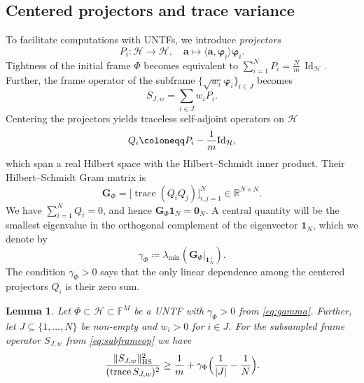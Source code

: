 \documentclass[a4paper]{amsart}
\numberwithin{equation}{section}
\newtheorem{lemma}[theorem]{Lemma}
\DeclareMathOperator{\trace}{trace}
\DeclareMathOperator{\Id}{Id}
\begin{document}
\subsection{Centered projectors and trace variance}

To facilitate computations with UNTFs, we introduce \emph{projectors}
\begin{equation*}
    P_i\colon\mathcal H\to\mathcal H,\quad \bm a\mapsto\langle \bm a,\bm\varphi_i\rangle\bm\varphi_i .
\end{equation*}
Tightness of the initial frame $\Phi$ becomes equivalent to $\sum_{i=1}^{N} P_i = \frac Nm \, \Id_{\mathcal H}$.
Further, the frame operator of the subframe $\{\sqrt{w_i}\bm\varphi_i\}_{i\in J}$ becomes
\begin{equation}\label{eq:subframeop}
    S_{J,w} = \sum_{i\in J}w_iP_i .
\end{equation}
Centering the projectors yields traceless self-adjoint operators on $\mathcal H$
\begin{equation}\label{eq:Q}
    Q_i \coloneqq P_i - \frac 1m {\rm Id}_{\mathcal H},
\end{equation}
which span a real Hilbert space with the Hilbert--Schmidt inner product.
Their Hilbert--Schmidt Gram matrix is
\begin{equation}\label{eq:gram}
    \bm G_\Phi = \Big[\trace(Q_iQ_j)\Big]_{i,j=1}^{N} \in\mathds R^{N\times N} .
\end{equation}
We have $\sum_{i=1}^{N} Q_i = 0$, and hence $\bm G_\Phi\bm 1_N = \bm 0_N$.
A central quantity will be the smallest eigenvalue in the orthogonal complement of the eigenvector $\bm 1_N$, which we denote by
\begin{equation}\label{eq:gamma}
    \gamma_\Phi\coloneqq\lambda_{\min}(\bm G_\Phi |_{\bm 1_N^\perp}) .
\end{equation}
The condition $\gamma_\Phi>0$ says that the only linear dependence among the centered projectors $Q_i$ is their zero sum.

\begin{lemma}\label{tracevariance}
    Let $\Phi\subset\mathcal H\subset\mathds F^M$ be a UNTF with $\gamma_\Phi>0$ from \eqref{eq:gamma}.
    Further, let $J\subseteq\{1,\dots,N\}$ be non-empty and $w_i>0$ for $i\in J$.
    For the subsampled frame operator $S_{J,w}$ from \eqref{eq:subframeop} we have
    \begin{equation*}
        \frac{\|S_{J,w}\|_{\rm HS}^2}{(\trace S_{J,w})^2} 
        \ge \frac 1m + \gamma_\Phi\Big(\frac{1}{|J|}-\frac 1N\Big) .
    \end{equation*}
\end{lemma}
\end{document}

